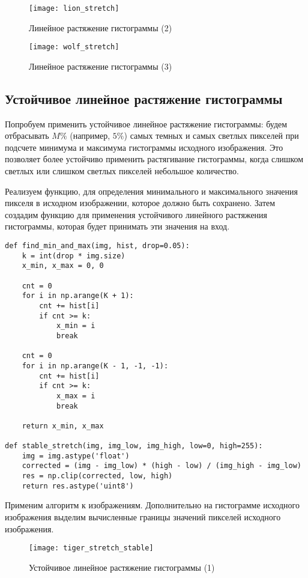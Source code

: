 \begin{figure}[H]
	\centering
	\texttt{[image: lion\_stretch]}
	\caption{Линейное растяжение гистограммы (2)}
\end{figure}

\begin{figure}[H]
	\centering
	\texttt{[image: wolf\_stretch]}
	\caption{Линейное растяжение гистограммы (3)}
\end{figure}

\subsection{Устойчивое линейное растяжение гистограммы}

Попробуем применить устойчивое линейное растяжение гистограммы: будем отбрасывать $M\%$ (например, $5\%$) самых темных и самых светлых пикселей при подсчете минимума и максимума гистограммы исходного изображения. Это позволяет более устойчиво применить растягивание гистограммы, когда слишком светлых или слишком светлых пикселей небольшое количество.

Реализуем функцию, для определения минимального и максимального значения пикселя в исходном изображении, которое должно быть сохранено. Затем создадим функцию для применения устойчивого линейного растяжения гистограммы, которая будет принимать эти значения на вход.

\begin{lstlisting}
def find_min_and_max(img, hist, drop=0.05):    
	k = int(drop * img.size)
	x_min, x_max = 0, 0

	cnt = 0
	for i in np.arange(K + 1):
		cnt += hist[i]
		if cnt >= k:
			x_min = i
			break

	cnt = 0
	for i in np.arange(K - 1, -1, -1):
		cnt += hist[i]
		if cnt >= k:
			x_max = i
			break

	return x_min, x_max

def stable_stretch(img, img_low, img_high, low=0, high=255):
	img = img.astype('float')
	corrected = (img - img_low) * (high - low) / (img_high - img_low)
	res = np.clip(corrected, low, high)
	return res.astype('uint8')
\end{lstlisting}

Применим алгоритм к изображениям. Дополнительно на гистограмме исходного изображения выделим вычисленные границы значений пикселей исходного изображения.

\begin{figure}[H]
	\centering
	\texttt{[image: tiger\_stretch\_stable]}
	\caption{Устойчивое линейное растяжение гистограммы (1)}
\end{figure}

